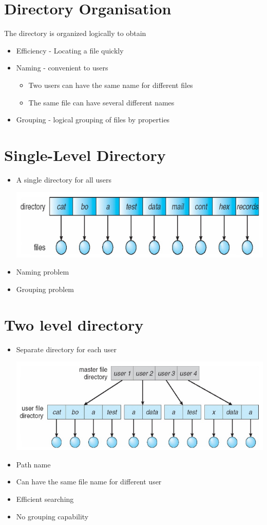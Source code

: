\documentclass{article}[18pt]
\begin{document}
\section{Directory Organisation}
The directory is organized logically to obtain
\begin{itemize}
	\item Efficiency - Locating a file quickly
	\item Naming - convenient to users
	\begin{itemize}
		\item Two users can have the same name for different files
		\item The same file can have several different names
	\end{itemize}
	\item Grouping - logical grouping of files by properties
\end{itemize}
\section{Single-Level Directory}
\begin{itemize}
	\item A single directory for all users
	\begin{center}
		\includegraphics[scale=0.7]{single}
	\end{center}
	\item Naming problem
	\item Grouping problem
\end{itemize}
\section{Two level directory}
\begin{itemize}
	\item Separate directory for each user
	\begin{center}
		\includegraphics[scale=0.7]{two}
	\end{center}
	\item Path name
	\item Can have the same file name for different user
	\item Efficient searching
	\item No grouping capability
\end{itemize}
\end{document}
